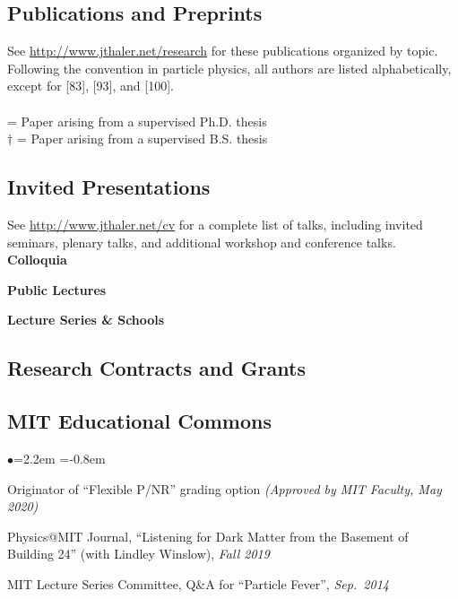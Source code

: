 \documentclass[11pt]{article}
\newcommand{\heading}[1]{\vspace{0in}\subsection*{#1} \vspace{.02in}}
\newcommand{\bbl}{\begin{list}{$\bullet$}{\leftmargin=2.2em \itemsep=-1pt \itemindent=-0.8em}}
\newcommand{\el}{\end{list}}
\begin{document}

\heading{Publications and Preprints}

See \url{http://www.jthaler.net/research} for these publications organized by topic.  Following the convention in particle physics, all authors are listed alphabetically, except for [83], [93], and [100]. \\
~\\
\noindent * = Paper arising from a supervised Ph.D. thesis\\
\noindent $\dagger$ = Paper arising from a supervised B.S. thesis\\

\vspace{-.1in}
 



\heading{Invited Presentations}

See \url{http://www.jthaler.net/cv} for a complete list of talks, including invited seminars, plenary talks, and additional workshop and conference talks.\\

\noindent \textbf{Colloquia}




\noindent \textbf{Public Lectures}




\noindent \textbf{Lecture Series \& Schools}



  
\heading{Research Contracts and Grants}





\heading{MIT Educational Commons}

\bbl
\item Originator of ``Flexible P/NR'' grading option \textit{(Approved by MIT Faculty, May 2020)}

\item Physics@MIT Journal, ``Listening for Dark Matter from the Basement of Building 24'' (with Lindley Winslow), \textit{Fall 2019}
\item MIT Lecture Series Committee, Q\&A for ``Particle Fever'', \textit{Sep.~2014}
\el
\end{document}
